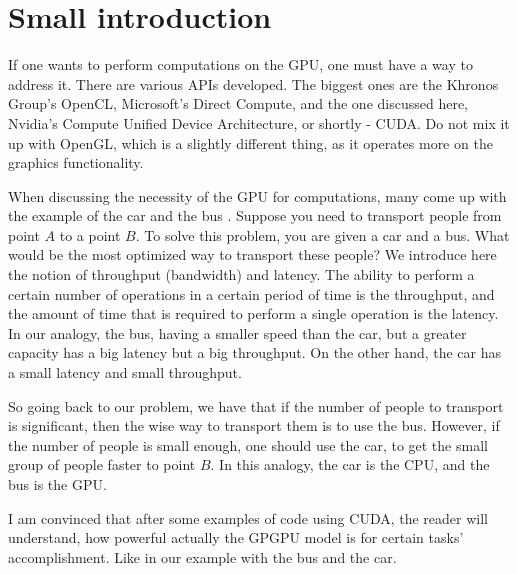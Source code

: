 \newpage

\section*{Small introduction}
If one wants to perform computations on the GPU, one must have a way to address it. There are various 
APIs developed. The biggest ones are the Khronos Group's OpenCL, Microsoft's Direct Compute, and the one 
discussed here, Nvidia's Compute Unified Device Architecture, or shortly - CUDA. Do not mix it up with 
OpenGL, which is a slightly different thing, as it operates more on the graphics functionality.


When discussing the necessity of the GPU for computations, many come up with the example of the car and the bus \cite{habr_car_vs_bus}. 
Suppose you need to transport people from point $A$ to a point $B$. To solve this problem, you are 
given a car and a bus. What would be the most optimized way to transport these people? We introduce here
the notion of throughput (bandwidth) and latency. The ability to perform a certain number of operations in a certain period of 
time is the throughput, and the amount of time that is required to perform a single operation is the latency.
In our analogy, the bus, having a smaller speed than the car, but a greater capacity has a big latency but 
a big throughput. On the other hand, the car has a small latency and small throughput.


So going back to our problem, we have that if the number of people to transport is significant, 
then the wise way to transport them is to use the bus. However, if the number of people is small enough, 
one should use the car, to get the small group of people faster to point $B$. 
In this analogy, the car is the CPU, and the bus is the GPU.

I am convinced that after some examples of code using CUDA, the reader will understand, how powerful
actually the GPGPU model is for certain tasks' accomplishment. Like in our example with the bus and the car.

